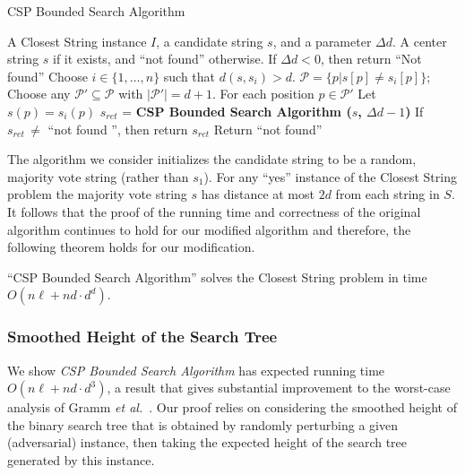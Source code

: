 \begin{algorithm*}[h]
\caption{CSP Bounded Search Algorithm}
\begin{algorithmic}
 A {\sc Closest String} instance $I$, a candidate string $s$, and a parameter $\Delta d$.
 A center string $s$ if it exists, and ``not found'' otherwise.
\STATE If $\Delta d < 0$, then return ``Not found''
\STATE Choose $i \in \{1, \ldots, n\}$ such that $d(s, s_i) > d$. 
\STATE \hspace{5mm} $\mathcal{P} = \{p | s[p] \ne s_i[p]\}$;
\STATE \hspace{5mm} Choose any $\mathcal{P}' \subseteq \mathcal{P}$ with $|\mathcal{P}'| = d + 1$.
\STATE \hspace{5mm} For each position $p \in \mathcal{P}'$
\STATE \hspace{10mm} Let $s(p) = s_i(p)$ 
\STATE \hspace{10mm} $s_{ret}$ = {\bf CSP Bounded Search Algorithm ($s$, $\Delta d - 1$)} 
\STATE \hspace{10mm} If $s_{ret} \, \ne$ ``not found '', then return $s_{ret}$
\STATE Return ``not found''
\end{algorithmic}
\end{algorithm*}


The algorithm we consider initializes the candidate string to be a random, majority vote string (rather than $s_1$). For any ``yes'' instance of the {\sc Closest String} problem the majority vote string $s$ has distance at most $2d$ from each string in $S$. It follows that the proof of the running time and correctness of the original algorithm continues to hold for our modified algorithm and therefore, the following theorem holds for our modification.

\begin{theorem} \label{worst_case_theorem} \cite{GNR03} ``CSP Bounded Search Algorithm'' solves the {\sc Closest String} problem in time $O(n\ell + nd \cdot d^d)$. \end{theorem}


\subsubsection{Smoothed Height of the Search Tree} \label{smoothed_analysis_section}

We show {\em CSP Bounded Search Algorithm} has expected running time $O(n\ell + n d \cdot d^3)$, a result that gives substantial improvement to the worst-case analysis of Gramm {\em et al.}\ \cite{GNR03}. Our proof relies on considering the smoothed height of the binary search tree that is obtained by randomly perturbing a given (adversarial) instance, then taking the expected height of the search tree generated by this instance.  

